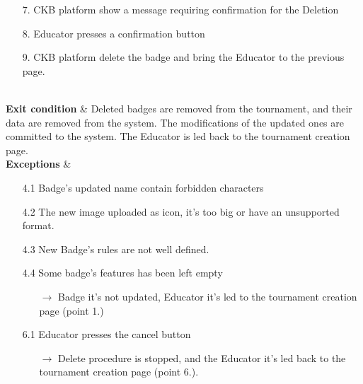 \documentclass{article}
\begin{document}
{\begin{enumerate}
\begin{xltabular}{\textwidth}
\begin{enumerate}
                                                        the badge and present on the tournament creation page. 
                                                        \item[7.] CKB platform show a message requiring confirmation
                                                        for the Deletion
                                                        \item[8.] Educator presses a confirmation button
                                                        \item[9.] CKB platform delete the badge and bring the Educator 
                                                        to the previous page.
                                                    \end{enumerate} \\
                        \hline
                        \textbf{Exit condition} & Deleted badges are removed from the tournament, and their data are removed
                        from the system. The modifications of the updated ones are committed to the system. The Educator
                        is led back to the tournament creation page. \\
                        \hline
                        \textbf{Exceptions} &    \begin{itemize}
                                                    \item[4.1] Badge's updated name contain forbidden characters
                                                    \item[4.2] The new image uploaded as icon, it's too big or have an unsupported format.
                                                    \item[4.3] New Badge's rules are not well defined.
                                                    \item[4.4] Some badge's features has been left empty 
                                                    \begin{itemize}
                                                        \item[$\rightarrow$] Badge it's not updated, Educator it's led to
                                                        the tournament creation page (point 1.)
                                                    \end{itemize}
                                                    \item[6.1] Educator presses the cancel button 
                                                    \begin{itemize}
                                                        \item[$\rightarrow$] Delete procedure is stopped, and the Educator
                                                        it's led back to the tournament creation page (point 6.).
                                                    \end{itemize} 


\end{itemize}
\end{xltabular}
\end{enumerate}}
\end{document}

